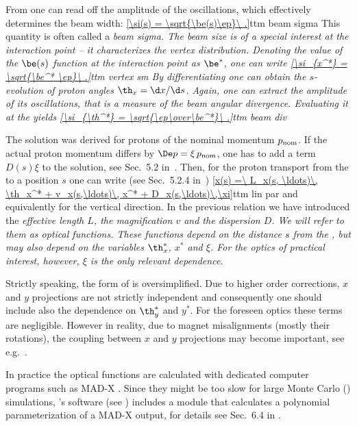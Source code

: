 From  one can read off the amplitude of the oscillations, which effectively determines the beam width:
\eqref{\si(s) = \sqrt{\be(s)\ep}\ .}{ttm beam sigma}
This quantity is often called a \em{beam sigma}. The beam size is of a special interest at the interaction point -- it characterizes the vertex distribution. Denoting the value of the $\be(s)$ function at the interaction point as $\be^*$, one can write
\eqref{\si_{x^*} = \sqrt{\be^* \ep}\ .}{ttm vertex sm}
By differentiating  one can obtain the $s$-evolution of proton angles $\th_x = \d x/\d s$. Again, one can extract the amplitude of its oscillations, that is a measure of the beam angular divergence. Evaluating it at the  yields
\eqref{\si_{\th^*} = \sqrt{\ep\over\be^*}\ .}{ttm beam div}

The solution  was derived for protons of the nominal momentum $p_{\rm nom}$. If the actual proton momentum differs by $\De p = \xi\, p_{\rm nom}$, one has to add a term $D(s) \xi$ to the solution, see Sec.~5.2 in~. Then, for the proton transport from the  to a position $s$ one can write (see Sec.~5.2.4 in~)
\eqref{x(s) =\ L_x(s, \ldots)\, \th_x^* + v_x(s,\ldots)\, x^* + D_x(s,\ldots)\,\xi}{ttm lin par}
and equivalently for the vertical direction. In the previous relation we have introduced the \em{effective length} $L$, the \em{magnification} $v$ and the \em{dispersion} $D$. We will refer to them as \em{optical functions}. These functions depend on the distance $s$ from the , but may also depend on the variables $\th_x^*$, $x^*$ and $\xi$. For the optics of practical interest, however, $\xi$ is the only relevant dependence.

Strictly speaking, the form of  is oversimplified. Due to higher order corrections, $x$ and $y$ projections are not strictly independent and consequently one should include also the dependence on $\th_y^*$ and $y^*$. For the foreseen optics these terms are negligible. However in reality, due to magnet misalignments (mostly their rotations), the coupling between $x$ and $y$ projections may become important, see e.g.~.

In practice the optical functions are calculated with dedicated computer programs such as MAD-X . Since they might be too slow for large Monte Carlo () simulations, 's software (see ) includes a module that calculates a polynomial parameterization of a MAD-X output, for details see Sec.~6.4 in .

